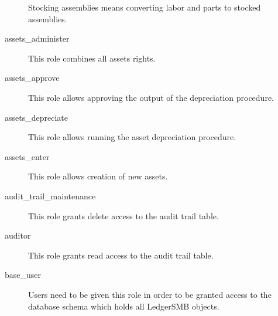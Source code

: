 \begin{description}
                         Stocking assemblies means converting labor and parts to stocked assemblies.
\item [assets\_administer] \htmlspacing 
                         This role combines all assets rights.
\item [assets\_approve] \htmlspacing 
                         This role allows approving the output of the
                         depreciation procedure.
\item [assets\_depreciate] \htmlspacing 
                         This role allows running the asset depreciation
                         procedure.
\item [assets\_enter] \htmlspacing 
                         This role allows creation of new assets.
\item [audit\_trail\_maintenance] \htmlspacing 
                         This role grants delete access to the audit trail table.
\item [auditor] \htmlspacing 
                         This role grants read access to the audit trail table.
\item [base\_user] \htmlspacing 
  Users need to be given this role in order to be granted access to the database schema which holds all LedgerSMB objects.


\end{description}
